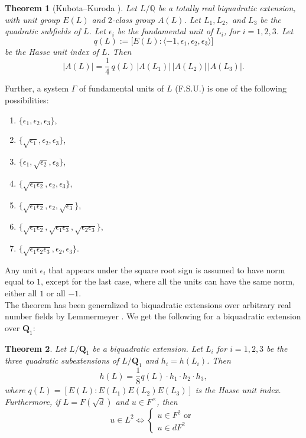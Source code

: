 \documentclass{article}
\numberwithin{equation}{section}
\theoremstyle{plain}  %
\newtheorem{theorem}{Theorem}[section]
\theoremstyle{definition}
\begin{document}
\begin{theorem}[Kubota--Kuroda {\cite{MR83009}}] \label{kuroda}
Let $L/\mathbb{Q}$ be a totally real biquadratic extension, with unit group $E(L)$
and $2$-class group $A(L)$. Let $L_1, L_2,$ and $L_3$ be the quadratic subfields of $L$.
Let $\epsilon_i$ be the fundamental unit of $L_i$, for $i=1,2,3$.
Let
$$
q(L) := \bigl[E(L) : \langle -1, \epsilon_1, \epsilon_2, \epsilon_3 \rangle \bigr]
$$
be the Hasse unit index of $L$. Then
$$
|A(L)| = \frac{1}{4}\, q(L)\, |A(L_1)|\, |A(L_2)|\, |A(L_3)|.
$$
\end{theorem}

Further, a system $\Gamma$ of fundamental units of $L$ (F.S.U.) is one of the following
possibilities:
\begin{enumerate}
  \item $\{\epsilon_1, \epsilon_2, \epsilon_3\}$,
  \item $\{\sqrt{\epsilon_1}, \epsilon_2, \epsilon_3\}$,
  \item $\{\epsilon_1, \sqrt{\epsilon_2}, \epsilon_3\}$,
  \item $\{\sqrt{\epsilon_1 \epsilon_2}, \epsilon_2, \epsilon_3\}$,
  \item $\{\sqrt{\epsilon_1 \epsilon_2}, \epsilon_2, \sqrt{\epsilon_3}\}$,
  \item $\{\sqrt{\epsilon_1 \epsilon_2}, \sqrt{\epsilon_1 \epsilon_3}, \sqrt{\epsilon_2 \epsilon_3}\}$,
  \item $\{\sqrt{\epsilon_1 \epsilon_2 \epsilon_3}, \epsilon_2, \epsilon_3\}$.
\end{enumerate}

Any unit $\epsilon_i$ that appears under the square root sign is assumed to have
norm equal to $1$, except for the last case, where all the units can have the same
norm, either all $1$ or all $-1$.\\


The theorem has been generalized to biquadratic extensions over arbitrary real number fields by Lemmermeyer \cite{MR1276992}. We get the following for a biquadratic extension over $\mathbf {Q}_1$:
\begin{theorem} \label{th: lemmermeyer biquadratic class number}
    Let $L/\mathbf Q_1$ be a biquadratic extension. Let $L_i$ for $i=1,2,3$ be the three quadratic subextensions of $L/\mathbf Q_1$ and $h_i=h(L_i)$. Then $$h(L)=\frac 18 q(L) \cdot h_1\cdot h_2 \cdot h_3,$$ where $q(L)=[E(L):E(L_1)E(L_2)E(L_3)]$ is the Hasse unit index.\\
    
    Furthermore, if $L=F(\sqrt{d})$ and $u \in F^\times$, then $$u \in L^2 \iff \begin{cases} u \in F^2 \text{ or } \\ 
        u \in dF^2 
    \end{cases}$$ 
\end{theorem} 
\end{document}
